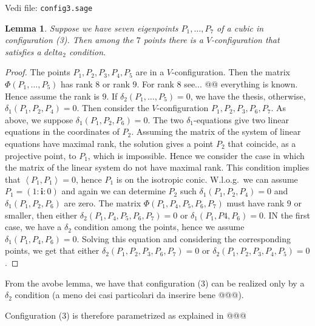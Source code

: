 \documentclass[11pt, a4paper, reqno, captions=tableheading,bibliography=totoc]{scrartcl}
\theoremstyle{plain}
\newtheorem{lemma}{Lemma}[section]
\theoremstyle{definition}
\newcommand{\scl}[2]{\left\langle {#1}, {#2} \right\rangle}
\newcommand{\iii}{\textbf{i}}
\begin{document}
Vedi file: \verb+config3.sage+
\begin{lemma}
\label{no_delta1_delta1} Suppose we have  seven eigenpoints $P_1, \dots, P_7$
of a cubic in configuration (3). Then among the $7$ points there is a
$V$-configuration that satisfies a $delta_2$ condition.
\end{lemma}
\begin{proof}
The points $P_1, P_2, P_3, P_4, P_5$ are in a $V$-configuration. Then 
the matrix $\Phi(P_1, \dots, P_5)$ has rank $8$ or rank $9$. For rank $8$
see... @@ everything is known. Hence assume the rank is $9$. If
$\delta_2(P_1, \dots, P_5) = 0$, we have the thesis, otherwise,
$\delta_1(P_1, P_2, P_4) = 0$. Then consider the $V$-configuration
$P_1, P_2, P_3, P_6, P_7$. As above, we suppose $\delta_1(P_1, P_2, P_6) = 0$.
The two $\delta_1$-equations give two linear equations in the coordinates
of $P_2$. Assuming the matrix of the system of linear equations have
maximal rank, the solution gives a point $P_2$ that coincide, as
a projective point, to $P_1$, which is impossible. Hence we consider the
case in which the matrix of the linear system do not have maximal rank.
This condition implies that $\scl{P_1}{P_1} = 0$, hence $P_1$ is on the
isotropic conic. W.l.o.g.\ we can assume $P_1 = (1: \iii: 0)$ and again 
we can determine $P_2$ such $\delta_1(P_1, P_2, P_4) = 0$ and
$\delta_1(P_1, P_2, P_6)$ are zero. The matrix $\Phi(P_1, P_4, P_5, P_6, P_7)$
must have rank $9$ or smaller, then either
$\delta_2(P_1, P_4, P_5, P_6, P_7)=0$ or $\delta_1(P_1, P4, P_6) = 0$. IN
the first case, we have a $\delta_2$ condition among the points, hence
we assume $\delta_1(P_1, P_4, P_6) = 0$. Solving this equation and
considering the corresponding points, we get that either
$\delta_2(P_1, P_2, P_3, P_6, P_7) = 0$ or
$\delta_2(P_1, P_2, P_3, P_4, P_5)=0$.
\end{proof}

From the avobe lemma, we have that configuration (3) can be
realized only by a $\delta_2$ condition (a meno dei casi particolari
da inserire bene @@@).

Configuration (3) is therefore parametrized as explained in @@@
\end{document}
